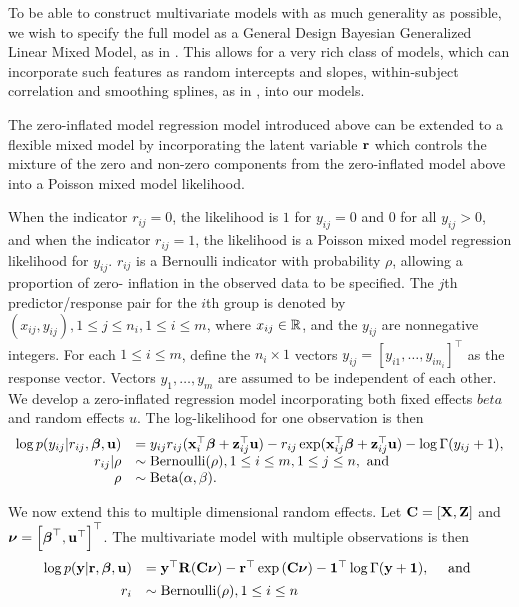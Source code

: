 To be able to construct multivariate models with as much generality as
possible, we wish to specify the full model as a General Design Bayesian
Generalized Linear Mixed Model, as in \cite{Zhao2006}. This allows for a very
rich class of models, which can incorporate such features as random intercepts
and slopes, within-subject correlation and smoothing splines, as in
\cite{Wand2008}, into our models.

The zero-inflated model regression model introduced above can be extended to a
flexible mixed model by incorporating the latent variable ${\bf r}$ which controls
the mixture of the zero and non-zero components from the zero-inflated model
above into a Poisson mixed model likelihood.

When the indicator $r_{ij} = 0$, the likelihood is $1$ for $y_{ij} = 0$ and $0$
for all $y_{ij} > 0$, and when the indicator $r_{ij} = 1$, the likelihood is a
Poisson mixed model regression likelihood for $y_{ij}$.  $r_{ij}$ is a
Bernoulli indicator with probability $\rho$, allowing a proportion of zero-
inflation in the observed data to be specified. The $j$th predictor/response
pair for the $i$th group is denoted by $(x_{ij}, y_{ij}), 1 \leq j \leq n_i, 1
\leq i \leq m$, where $x_{ij} \in {\mathbb{R}}$, and the $y_{ij}$ are nonnegative
integers. For each $1 \leq i \leq m$, define the $n_i \times 1$ vectors $y_{ij}
= [y_{i 1}, \ldots, y_{i n_i}]^\top$ as the response vector. Vectors $y_1,
\ldots, y_m$ are assumed to be independent of each other.  We develop a
zero-inflated regression model incorporating both fixed effects $beta$ and
random effects $u$. The log-likelihood for one observation is then
\begin{equation*}
	\begin{array}{rl}
		\log p(y_{ij} | r_{ij}, {\boldsymbol \beta}, {\bf u}) & = y_{ij} r_{ij} ({\bf x}_i^\top {\boldsymbol\beta} + {\bf z}_{ij}^\top {\bf u}) - r_{ij} \exp ({\bf x}_{ij}^\top {\boldsymbol\beta} + {\bf z}_{ij}^\top {\bf u}) - \log \Gamma (y_{ij} + 1), \\
		r_{ij} | \rho                  & \sim \text{Bernoulli}(\rho), 1 \leq i \leq m, 1 \leq j \leq n, \text{ and }                                                              \\
		\rho                        & \sim \text{Beta}(\alpha, \beta).                                                                                              \\
	\end{array}
\end{equation*}

\noindent We now extend this to multiple dimensional random effects. Let ${\bf C} =
[{\bf X}, {\bf Z}]$ and ${\boldsymbol \nu} = \left[ {\boldsymbol \beta}^\top, {\bf u}^\top \right]^\top$. The
multivariate model with multiple observations is then 
\begin{equation*}
    \begin{array}{rl} \log{p({\bf y}|{\bf r}, {\boldsymbol\beta}, {\bf u})} &= {\bf y}^\top {\bf R} ({\bf C}{\boldsymbol \nu})
        - {\bf r}^\top \exp{({\bf C}{\boldsymbol\nu})} - {\bf 1}^\top \log{\Gamma{({\bf y}+ {\bf1})}},
        \quad \mbox{ and } \\
        [1ex] r_i& \sim \text{Bernoulli}(\rho), 1 \leq i \leq n \\ 
    \end{array} 
\end{equation*}

